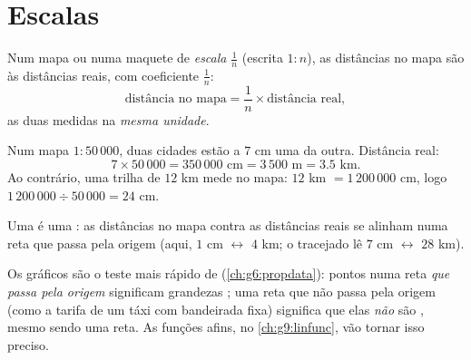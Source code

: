 \section{Escalas}

\begin{definition}[Escala]\label{def:g7:prop:scale}
Num mapa ou numa maquete de \emph{escala}
$\frac{1}{n}$ (escrita $1 : n$), as distâncias no mapa são
 às distâncias reais, com coeficiente $\frac1n$:
\[
\text{distância no mapa} = \frac{1}{n} \times \text{distância real},
\]
as duas medidas na \emph{mesma unidade}.
\end{definition}

\begin{example}\label{ex:g7:prop:scale}
Num mapa $1 : 50\,000$, duas cidades estão a $7$ cm uma da outra.
Distância real:
\[
7 \times 50\,000 = 350\,000 \text{ cm} = 3\,500 \text{ m} = 3.5
\text{ km}.
\]
Ao contrário, uma trilha de $12$ km mede no mapa: $12$ km $=
1\,200\,000$ cm, logo $1\,200\,000 \div 50\,000 = 24$ cm.
\end{example}

\begin{omfigure}

{\small Uma  é uma : as distâncias no mapa
contra as distâncias reais se alinham numa reta que passa pela origem
(aqui, $1$ cm $\leftrightarrow$ $4$ km; o tracejado lê $7$ cm
$\leftrightarrow$ $28$ km).}
\end{omfigure}

\begin{remark}
Os gráficos são o teste mais rápido de 
(\cref{ch:g6:propdata}): pontos numa reta \emph{que passa pela origem}
significam grandezas ; uma reta que não passa pela origem
(como a tarifa de um táxi com bandeirada fixa) significa que elas
\emph{não} são , mesmo sendo uma reta. As funções afins,
no \cref{ch:g9:linfunc}, vão tornar isso preciso.
\end{remark}

